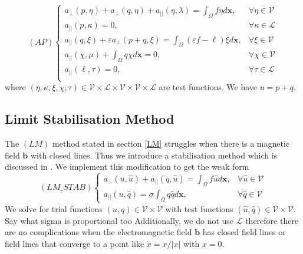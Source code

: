 \documentclass[12pt]{ociamthesis}
\begin{document}
\begin{equation} \label{AP_w}
(AP)
\begin{cases}
a_{\perp}(p, \eta)+a_{\perp}(q, \eta) + a_{||}(\eta, \lambda) = \int_{\Omega}f \eta d\mathbf{x},
&\forall \eta \in \mathcal{V}\\
a_{||}(p, \kappa) = 0, 
&\forall \kappa \in \mathcal{L}\\
a_{||}(q, \xi) + \varepsilon a_{\perp}(p+q, \xi) = 
\int_{\Omega} (\varepsilon f -\ell)\xi d\mathbf{x},
&\forall \xi \in \mathcal{V}\\
a_{||}(\chi, \mu) + \int_{\Omega}q \chi d\mathbf{x} = 0,
&\forall \chi \in \mathcal{V}\\
a_{||}(\ell, \tau) = 0,
&\forall \tau \in \mathcal{L}\\
\end{cases}
\end{equation}
where $(\eta, \kappa, \xi, \chi, \tau)\in \mathcal{V} \times \mathcal{L}  \times \mathcal{V}  \times \mathcal{V}  \times \mathcal{L}$ are test functions. We have $u=p+q$.


\subsection{Limit Stabilisation Method} \label{LM_STAB}
The $(LM)$ method stated in section \ref{LM} struggles when there is a magnetic field $\mathbf{b}$ with closed lines. Thus we introduce a stabilisation method which is discussed in \cite{STAB}. We implement this modification to get the weak form
\begin{equation} \label{LM_STAB_w}
(LM\_STAB)
\begin{cases}
a_{\perp}(u, \hat{u}) + a_{||}(q, \hat{u}) = \int_{\Omega} f \hat{u} d\mathbf{x}, 
&\forall \hat{u} \in \mathcal{V}\\
a_{||}(u, \hat{q}) = \sigma \int_{\Omega} q \hat{q} d\mathbf{x}, & \forall \hat{q} \in \mathcal{V}
\end{cases}
\end{equation}
We solve for trial functions $(u, q) \in \mathcal{V} \times \mathcal{V}$ with test functions $(\hat{u}, \hat{q}) \in \mathcal{V} \times \mathcal{V}$. Say what sigma is proportional too
Additionally, we do not use $\mathcal{L}$ therefore there are no complications when the electromagnetic field $\mathbf{b}$ has closed field lines or field lines that converge to a point like $\dot{x} = x/|x|$ with $x=0$.
\end{document}
